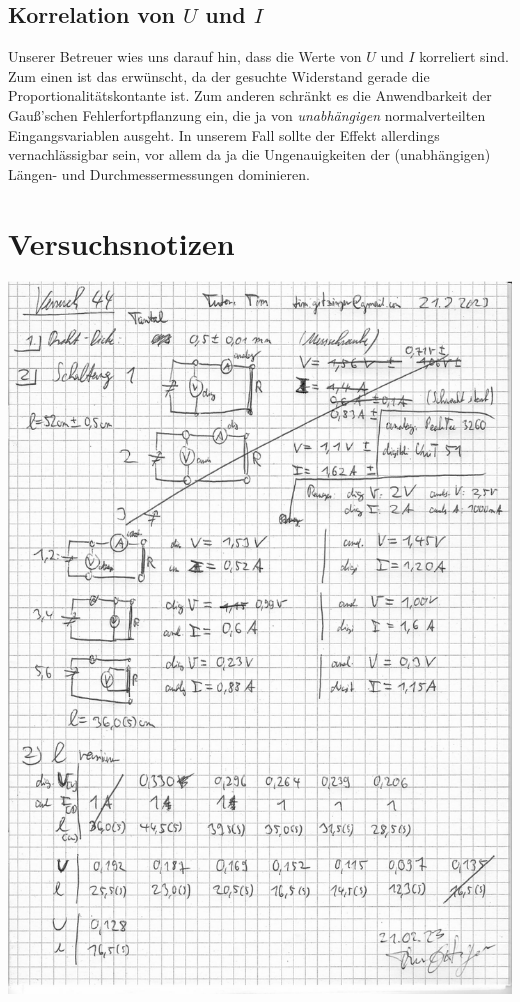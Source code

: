 \documentclass[parskip, 12pt, DIV=16, openany]{scrartcl}
\begin{document}
\subsection{Korrelation von $U$ und $I$}

Unserer Betreuer wies uns darauf hin, dass die Werte von $U$ und $I$ korreliert sind. Zum einen ist das erwünscht, da der gesuchte Widerstand gerade die Proportionalitätskontante ist. Zum anderen schränkt es die Anwendbarkeit der Gauß'schen Fehlerfortpflanzung ein, die ja von \emph{unabhängigen} normalverteilten Eingangsvariablen ausgeht. In unserem Fall sollte der Effekt allerdings vernachlässigbar sein, vor allem da ja die Ungenauigkeiten der (unabhängigen) Längen- und Durchmessermessungen dominieren.

\appendix
\section{Versuchsnotizen}\label{sec:labnotes}
\begin{center}
\includegraphics[page=1,scale=0.75]{labnotes.pdf}
\end{center}

\pagestyle{empty}



\end{document}
